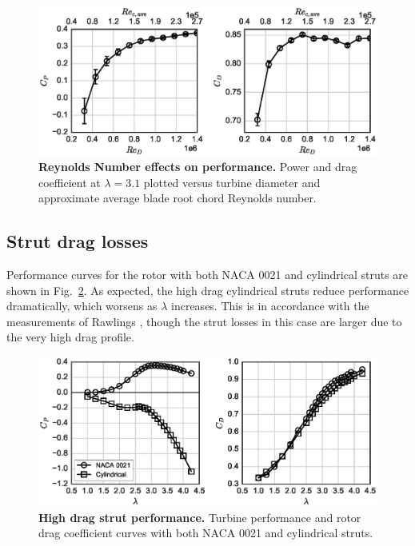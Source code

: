 \documentclass[10pt,letterpaper]{article}
\begin{document}
\begin{figure}[h]
    \includegraphics[width=\textwidth]{figures/perf_re_dep.eps}

    \caption{{\bf Reynolds Number effects on performance.} Power and drag
    coefficient at $\lambda=3.1$ plotted versus turbine diameter and approximate
    average blade root chord Reynolds number.}

    \label{fig:perf-re-dep}
\end{figure}


\subsection*{Strut drag losses}

Performance curves for the rotor with both NACA 0021 and cylindrical struts are
shown in Fig.~\ref{fig:perf-covers}. As expected, the high drag cylindrical
struts reduce performance dramatically, which worsens as $\lambda$ increases.
This is in accordance with the measurements of Rawlings \cite{Rawlings2008},
though the strut losses in this case are larger due to the very high drag profile.

\begin{figure}[ht!]
    \includegraphics[width=\textwidth]{figures/perf_covers.eps}
    
    \caption{{\bf High drag strut performance.} Turbine performance and rotor
        drag coefficient curves with both NACA 0021 and cylindrical struts.}
    
    \label{fig:perf-covers}
\end{figure}
\end{document}
